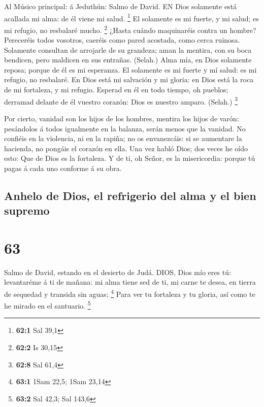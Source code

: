  Al Músico principal: á Jeduthún: Salmo de David. EN Dios
solamente está acallada mi alma: de él viene mi salud. \footnote{\textbf{62:1}
  Sal 39,1}  El solamente es mi fuerte, y mi salud; es mi
refugio, no resbalaré mucho. \footnote{\textbf{62:2} Is 30,15}
 ¿Hasta cuándo maquinaréis contra un hombre? Pereceréis
todos vosotros, caeréis como pared acostada, como cerca ruinosa.
 Solamente consultan de arrojarle de su grandeza; aman la
mentira, con su boca bendicen, pero maldicen en sus entrañas. (Selah.)
 Alma mía, en Dios solamente reposa; porque de él es mi
esperanza.  El solamente es mi fuerte y mí salud: es mi
refugio, no resbalaré.  En Dios está mi salvación y mi
gloria: en Dios está la roca de mi fortaleza, y mi refugio. 
Esperad en él en todo tiempo, oh pueblos; derramad delante de él vuestro
corazón: Dios es nuestro amparo. (Selah.) \footnote{\textbf{62:8} Sal
  61,4}

 Por cierto, vanidad son los hijos de los hombres, mentira
los hijos de varón: pesándolos á todos igualmente en la balanza, serán
menos que la vanidad.  No confiéis en la violencia, ni en
la rapiña; no os envanezcáis: si se aumentare la hacienda, no pongáis el
corazón en ella.  Una vez habló Dios; dos veces he oído
esto: Que de Dios es la fortaleza.  Y de ti, oh Señor, es
la misericordia: porque tú pagas á cada uno conforme á su obra.

\hypertarget{anhelo-de-dios-el-refrigerio-del-alma-y-el-bien-supremo}{%
\subsection{Anhelo de Dios, el refrigerio del alma y el bien
supremo}\label{anhelo-de-dios-el-refrigerio-del-alma-y-el-bien-supremo}}

\hypertarget{section-62}{%
\section{63}\label{section-62}}

 Salmo de David, estando en el desierto de Judá. DIOS, Dios
mío eres tú: levantaréme á ti de mañana: mi alma tiene sed de ti, mi
carne te desea, en tierra de sequedad y transida sin aguas; \footnote{\textbf{63:1}
  1Sam 22,5; 1Sam 23,14}  Para ver tu fortaleza y tu gloria,
así como te he mirado en el santuario. \footnote{\textbf{63:2} Sal 42,3;
  Sal 143,6}

